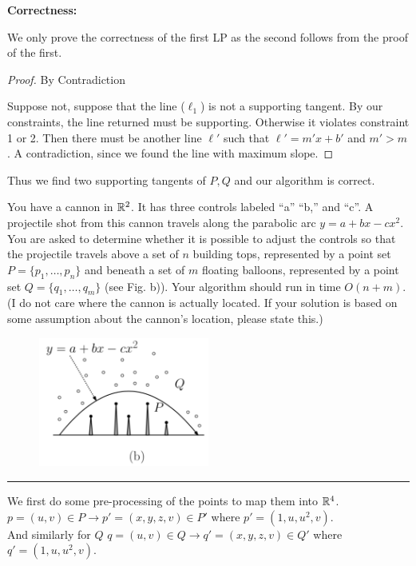 \documentclass[11pt]{article}
\begin{document}
\textbf{Correctness:}

We only prove the correctness of the first LP as the second follows from the proof of the first.

\begin{proof} By Contradiction

  Suppose not, suppose that the line ($\ell_1$) is not a supporting tangent. By our constraints,
  the line returned must be supporting. Otherwise it violates constraint 1 or 2.
  Then there must be another line $\ell '$ such that $\ell ' = m' x + b'$ and $m' > m$. A contradiction,
  since we found the line with maximum slope.
\end{proof}

Thus we find two supporting tangents of $P, Q$ and our algorithm is correct.




You have a cannon in $\mathbb{R}^2$. It has three controls labeled ``a'' ``b,''
and ``c''. A projectile shot from this cannon travels along the
parabolic arc $y = a + bx - cx^2$. You are asked to determine whether it
is possible to adjust the controls so that the projectile travels above
a set of $n$ building tops, represented by a point set $P = \{p_1,
\ldots , p_n\}$ and beneath a set of $m$ floating balloons, represented
by a point set $Q = \{q_1, \ldots , q_m\}$ (see Fig. b)). Your algorithm
should run in time $O(n + m)$. (I do not care where the cannon is
actually located. If your solution is based on some assumption about the
cannon's location, please state this.)

\begin{figure}[h]
  \centering
  \includegraphics[width = 0.5\textwidth]{lp_b.png}
\end{figure}

\hrule

We first do some pre-processing of the points to map them into $\mathbb{R} ^4$.
$p = (u,v) \in P \to p' = (x, y, z, v) \in P'$ where $p' = (1, u, u^2, v)$. \\
And similarly for $Q$ $q = (u,v) \in Q \to q' = (x, y, z, v) \in Q'$ where $q' = (1, u, u^2, v)$. 
\end{document}
